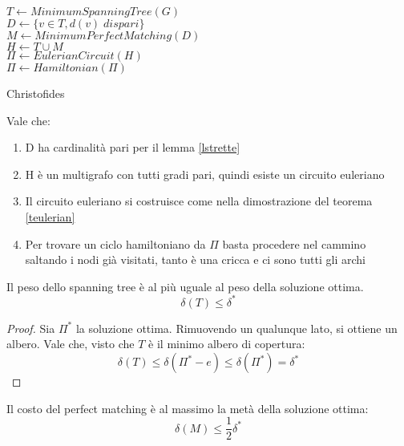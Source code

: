 \begin{algorithm}[H]
    \SetAlgoLined
     $T \gets \mathit{MinimumSpanningTree(G)}$\\
     $D \gets \{v \in T, d(v)\; \mathit{dispari}\}$\\
     $M \gets \mathit{MinimumPerfectMatching(D)}$\\ 
     $H \gets T \cup M$\\
     $\Pi \gets \mathit{EulerianCircuit(H)}$\\
     $\Pi \gets \mathit{Hamiltonian(\Pi)}$\\
     \Return{$\Pi$}
     \caption{Christofides}
\end{algorithm}
\begin{remark}
    Vale che:
    \begin{enumerate}
        \item D ha cardinalità pari per il lemma \ref{lstrette}
        \item H è un multigrafo con tutti gradi pari, quindi esiste un circuito euleriano
        \item Il circuito euleriano si costruisce come nella dimostrazione del teorema \ref{teulerian}
        \item Per trovare un ciclo hamiltoniano da $\Pi$ basta procedere nel cammino saltando i nodi già visitati,
        tanto è una cricca e ci sono tutti gli archi
    \end{enumerate}
\end{remark}
\begin{lemma}
    \label{tspl1}
    Il peso dello spanning tree è al più uguale al peso della soluzione ottima. $$\delta(T) \leq \delta^*$$
\end{lemma}
\begin{proof}
    Sia $\Pi^*$ la soluzione ottima.
    Rimuovendo un qualunque lato, si ottiene un albero.
    Vale che, visto che $T$ è il minimo albero di copertura:
    $$\delta(T) \leq \delta(\Pi^* - e) \leq \delta(\Pi^*) = \delta^*$$
\end{proof}
\begin{lemma}
    \label{tspl2}
    Il costo del perfect matching è al massimo la metà della soluzione ottima:
    $$\delta(M) \leq \frac{1}{2}\delta^*$$
\end{lemma}
